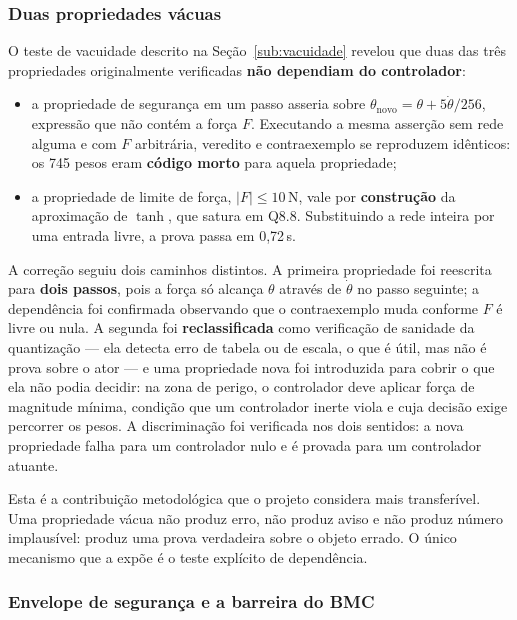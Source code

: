 \subsubsection{Duas propriedades vácuas}

O teste de vacuidade descrito na Seção~\ref{sub:vacuidade} revelou que duas das três
propriedades originalmente verificadas \textbf{não dependiam do controlador}:

\begin{itemize}[leftmargin=1.4cm]
  \item a propriedade de segurança em um passo asseria sobre
  $\theta_{\text{novo}} = \theta + 5\dot{\theta}/256$, expressão que não contém a força $F$.
  Executando a mesma asserção sem rede alguma e com $F$ arbitrária, veredito e contraexemplo
  se reproduzem idênticos: os 745 pesos eram \textbf{código morto} para aquela propriedade;
  \item a propriedade de limite de força, $|F| \le 10$\,N, vale por \textbf{construção} da
  aproximação de $\tanh$, que satura em Q8.8. Substituindo a rede inteira por uma entrada
  livre, a prova passa em 0,72\,s.
\end{itemize}

A correção seguiu dois caminhos distintos. A primeira propriedade foi reescrita para
\textbf{dois passos}, pois a força só alcança $\theta$ através de $\dot{\theta}$ no passo
seguinte; a dependência foi confirmada observando que o contraexemplo muda conforme $F$ é
livre ou nula. A segunda foi \textbf{reclassificada} como verificação de sanidade da
quantização --- ela detecta erro de tabela ou de escala, o que é útil, mas não é prova sobre o
ator --- e uma propriedade nova foi introduzida para cobrir o que ela não podia decidir: na
zona de perigo, o controlador deve aplicar força de magnitude mínima, condição que um
controlador inerte viola e cuja decisão exige percorrer os pesos. A discriminação foi
verificada nos dois sentidos: a nova propriedade falha para um controlador nulo e é provada
para um controlador atuante.

Esta é a contribuição metodológica que o projeto considera mais transferível. Uma propriedade
vácua não produz erro, não produz aviso e não produz número implausível: produz uma prova
verdadeira sobre o objeto errado. O único mecanismo que a expõe é o teste explícito de
dependência.

\subsubsection{Envelope de segurança e a barreira do BMC}

